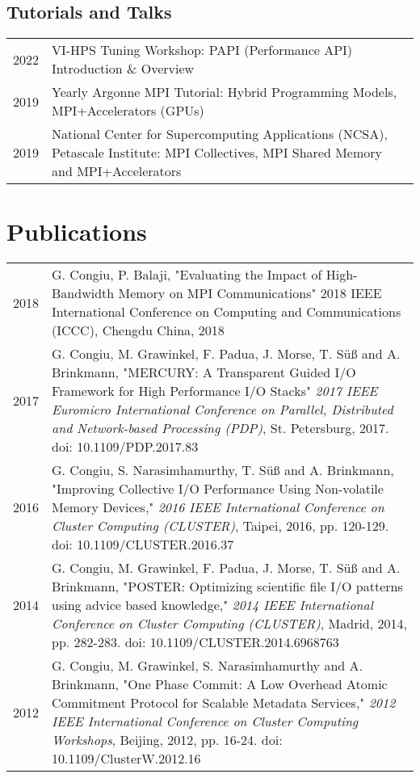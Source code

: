 \documentclass[a4paper,10pt]{article}
\begin{document}
\subsection*{Tutorials and Talks}
\begin{tabular}{p{1.45cm}p{11cm}}
    2022 & VI-HPS Tuning Workshop: PAPI (Performance API) Introduction \& Overview \\
    2019 & Yearly Argonne MPI Tutorial: Hybrid Programming Models, MPI+Accelerators (GPUs) \\
    2019 & National Center for Supercomputing Applications (NCSA), Petascale Institute: MPI Collectives, MPI Shared Memory and MPI+Accelerators\\
\end{tabular}

\section{Publications}
\begin{tabular}{p{1.45cm}p{11cm}}
        2018 & G. Congiu, P. Balaji, "Evaluating the Impact of High-Bandwidth Memory on MPI %
        Communications" 2018 IEEE International Conference on Computing and Communications (ICCC), %
        Chengdu China, 2018\\
        2017 & G. Congiu, M. Grawinkel, F. Padua, J. Morse, T. Süß and A. Brinkmann, "MERCURY: %
        A Transparent Guided I/O Framework for High Performance I/O Stacks" \textit{2017 IEEE %
        Euromicro International Conference on Parallel, Distributed and Network-based Processing (PDP)}, %
        St. Petersburg, 2017. doi: 10.1109/PDP.2017.83\\
        2016 & G. Congiu, S. Narasimhamurthy, T. Süß and A. Brinkmann, "Improving Collective %
        I/O Performance Using Non-volatile Memory Devices," \textit{2016 IEEE International Conference %
        on Cluster Computing (CLUSTER)}, Taipei, 2016, pp. 120-129. %
        doi: 10.1109/CLUSTER.2016.37\\
        2014 & G. Congiu, M. Grawinkel, F. Padua, J. Morse, T. Süß and A. Brinkmann, "POSTER: %
        Optimizing scientific file I/O patterns using advice based knowledge," \textit{2014 IEEE %
        International Conference on Cluster Computing (CLUSTER)}, Madrid, 2014, pp. 282-283. %
        doi: 10.1109/CLUSTER.2014.6968763\\
        2012 & G. Congiu, M. Grawinkel, S. Narasimhamurthy and A. Brinkmann, "One Phase Commit: %
        A Low Overhead Atomic Commitment Protocol for Scalable Metadata Services," \textit{2012 IEEE %
        International Conference on Cluster Computing Workshops}, Beijing, 2012, pp. 16-24. %
        doi: 10.1109/ClusterW.2012.16\\
\end{tabular}



\end{document}
